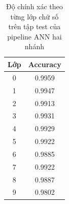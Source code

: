 \begin{table}[H]
\centering
\caption{Độ chính xác theo từng lớp chữ số trên tập test của pipeline ANN hai nhánh}
\label{tab:mnist-ann-class-accuracy}
\begin{tabular}{c c}
\toprule
Lớp & Accuracy \\
\midrule
0 & 0.9959 \\
1 & 0.9947 \\
2 & 0.9913 \\
3 & 0.9931 \\
4 & 0.9929 \\
5 & 0.9922 \\
6 & 0.9885 \\
7 & 0.9922 \\
8 & 0.9887 \\
9 & 0.9802 \\
\bottomrule
\end{tabular}
\end{table}
